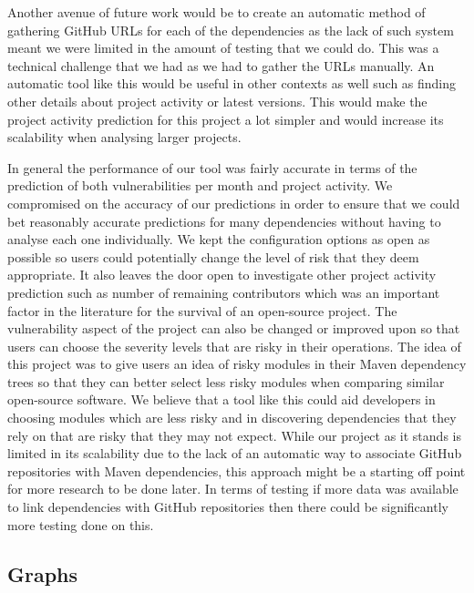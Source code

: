 \documentclass[conference]{IEEEtran}
\begin{document}
Another avenue of future work would be to create an automatic method of gathering GitHub URLs for each of the dependencies as the lack of such system meant we were limited in the amount of testing that we could do. This was a technical challenge that we had as we had to gather the URLs manually. An automatic tool like this would be useful in other contexts as well such as finding other details about project activity or latest versions. This would make the project activity prediction for this project a lot simpler and would increase its scalability when analysing larger projects. 

In general the performance of our tool was fairly accurate in terms of the prediction of both vulnerabilities per month and project activity. We compromised on the accuracy of our predictions in order to ensure that we could bet reasonably accurate predictions for many dependencies without having to analyse each one individually. We kept the configuration options as open as possible so users could potentially change the level of risk that they deem appropriate. It also leaves the door open to investigate other project activity prediction such as number of remaining contributors which was an important factor in the literature for the survival of an open-source project. The vulnerability aspect of the project can also be changed or improved upon so that users can choose the severity levels that are risky in their operations. The idea of this project was to give users an idea of risky modules in their Maven dependency trees so that they can better select less risky modules when comparing similar open-source software. We believe that a tool like this could aid developers in choosing modules which are less risky and in discovering dependencies that they rely on that are risky that they may not expect. While our project as it stands is limited in its scalability due to the lack of an automatic way to associate GitHub repositories with Maven dependencies, this approach might be a starting off point for more research to be done later. In terms of testing if more data was available to link dependencies with GitHub repositories then there could be significantly more testing done on this. 




\appendices

\subsection{Graphs}
\label{Graphs}
\end{document}
